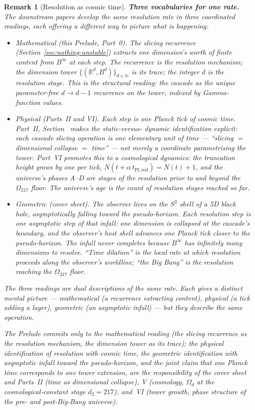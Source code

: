 \documentclass[11pt,a4paper]{article}
\newtheorem{remark}[theorem]{Remark}
\begin{document}
\begin{remark}[Resolution as cosmic time]
\smallskip
\noindent\textbf{Three vocabularies for one rate.} The downstream
papers develop the same resolution rate in three coordinated
readings, each offering a different way to picture what is happening:
\begin{itemize}
\item \emph{Mathematical (this Prelude, Part~0).} The slicing
recurrence (Section~\ref{sec:nothing-unstable}) extracts one
dimension's worth of finite content from $B^\infty$ at each step.
The recurrence is the resolution mechanism; the dimension tower
$\{(\mathbb{R}^d, B^d)\}_{d\in\mathbb{N}}$ is its trace; the integer
$d$ is the resolution stage. This is the structural reading: the
cascade as the unique parameter-free $d\to d-1$ recurrence on the
tower, indexed by Gamma-function values.
\item \emph{Physical (Parts~II and VI).} Each step is one Planck
tick of cosmic time. Part~II, Section~ makes the static-versus-
dynamic identification explicit: each cascade slicing operation
\emph{is} one elementary unit of time --- ``slicing $=$ dimensional
collapse $=$ time'' --- not merely a coordinate parametrising the
tower. Part~VI promotes this to a cosmological dynamics: the
truncation height grows by one per tick,
$N(t+\alpha\,t_{\mathrm{Pl,red}}) = N(t)+1$, and the universe's
phases A--D are stages of the resolution prior to and beyond the
$\Omega_{217}$ floor. The universe's age is the count of resolution
stages reached so far.
\item \emph{Geometric (cover sheet).} The observer lives on the
$S^3$ shell of a 5D black hole, asymptotically falling toward the
pseudo-horizon. Each resolution step is one asymptotic step of that
infall: one dimension is collapsed at the cascade's boundary, and
the observer's host shell advances one Planck tick closer to the
pseudo-horizon. The infall never completes because $B^\infty$ has
infinitely many dimensions to resolve. ``Time dilation'' is the
local rate at which resolution proceeds along the observer's
worldline; ``the Big Bang'' is the resolution reaching the
$\Omega_{217}$ floor.
\end{itemize}
The three readings are dual descriptions of the same rate. Each
gives a distinct mental picture --- mathematical (a recurrence
extracting content), physical (a tick adding a layer), geometric
(an asymptotic infall) --- but they describe the same operation.

\smallskip
The Prelude commits only to the mathematical reading (the slicing
recurrence as the resolution mechanism, the dimension tower as its
trace); the physical identification of resolution with cosmic time,
the geometric identification with asymptotic infall toward the
pseudo-horizon, and the joint claim that one Planck time corresponds
to one tower extension, are the responsibility of the cover sheet
and Parts~II (time as dimensional collapse), V (cosmology, $\Omega_d$
at the cosmological-constant stage $d_2=217$), and~VI (tower growth,
phase structure of the pre- and post-Big-Bang universe).
\end{remark}
\end{document}
